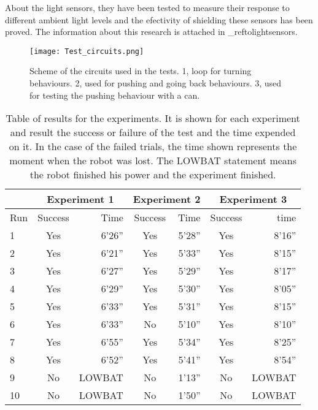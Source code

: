 About the light sensors, they have been tested to measure their response to different ambient light levels and the efectivity of shielding these sensors has been proved.
The information about this research is attached in \_reftolightsensors.


\begin{figure}[H]
\texttt{[image: Test\_circuits.png]}
\centering
\caption{Scheme of the circuits used in the tests. 1, loop for turning behaviours. 2, used for pushing and going back behaviours. 3, used for testing the pushing behaviour with a can. }
\label{fig:testMaps}
\end{figure}



\begin{table}[H]
	\center
	
	\begin{tabular}{|l|c|r|c|r|c|r|}
	  	\cline{2-7}
	  	\multicolumn{1}{r}{}
 		&  \multicolumn{2}{|c|}{Experiment 1}
 		& \multicolumn{2}{|c|}{Experiment 2} 
 		& \multicolumn{2}{|c|}{Experiment 3}  
		 \\ \cline{2-7}
		\hline
		Run & Success & Time & Success & Time & Success & time \\
		\hline
		1 	& Yes & 6'26'' & Yes & 5'28'' & Yes & 8'16''\\
		2 	& Yes & 6'21'' & Yes & 5'33'' & Yes & 8'15''\\
		3 	& Yes & 6'27'' & Yes & 5'29'' & Yes & 8'17''\\
		4 	& Yes & 6'29'' & Yes & 5'30'' & Yes & 8'05''\\
		5 	& Yes & 6'33'' & Yes & 5'31'' & Yes & 8'15''\\
		6 	& Yes & 6'33'' & No  & 5'10'' & Yes & 8'10''\\
		7 	& Yes & 6'55'' & Yes & 5'34'' & Yes & 8'25''\\
		8 	& Yes & 6'52'' & Yes & 5'41'' & Yes & 8'54''\\
		9 	& No & LOWBAT  & No  & 1'13'' & No 	& LOWBAT\\
		10 	& No & LOWBAT  & No  & 1'50'' & No 	& LOWBAT\\		
		\hline
	\end{tabular}

	\caption{Table of results for the experiments. It is shown for each experiment and result the success or failure of the test and the time expended on it. In the case of the failed trials, the time shown represents the moment when the robot was lost. The LOWBAT statement means the robot finished his power and the experiment finished.}
	\label{tab:Experiment1}
\end{table}


